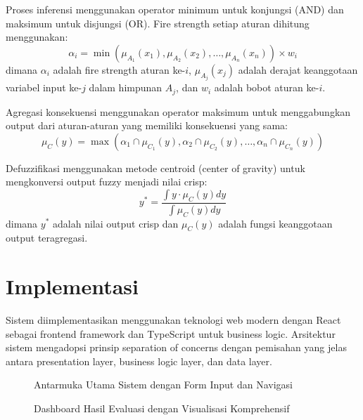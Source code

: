 \documentclass[12pt,a4paper]{article}
\begin{document}
Proses inferensi menggunakan operator minimum untuk konjungsi (AND) dan maksimum untuk disjungsi (OR). Fire strength setiap aturan dihitung menggunakan:
\begin{equation}
\alpha_i = \min(\mu_{A_1}(x_1), \mu_{A_2}(x_2), \dots, \mu_{A_n}(x_n)) \times w_i
\end{equation}
dimana $\alpha_i$ adalah fire strength aturan ke-$i$, $\mu_{A_j}(x_j)$ adalah derajat keanggotaan variabel input ke-$j$ dalam himpunan $A_j$, dan $w_i$ adalah bobot aturan ke-$i$.

Agregasi konsekuensi menggunakan operator maksimum untuk menggabungkan output dari aturan-aturan yang memiliki konsekuensi yang sama:
\begin{equation}
\mu_C(y) = \max(\alpha_1 \cap \mu_{C_1}(y), \alpha_2 \cap \mu_{C_2}(y), \dots, \alpha_n \cap \mu_{C_n}(y))
\end{equation}

Defuzzifikasi menggunakan metode centroid (center of gravity) untuk mengkonversi output fuzzy menjadi nilai crisp:
\begin{equation}
y^* = \frac{\int y \cdot \mu_C(y) dy}{\int \mu_C(y) dy}
\end{equation}
dimana $y^*$ adalah nilai output crisp dan $\mu_C(y)$ adalah fungsi keanggotaan output teragregasi.

\section{Implementasi}

Sistem diimplementasikan menggunakan teknologi web modern dengan React sebagai frontend framework dan TypeScript untuk business logic. Arsitektur sistem mengadopsi prinsip separation of concerns dengan pemisahan yang jelas antara presentation layer, business logic layer, dan data layer.

\begin{figure}[htbp] %
    \centering
    \caption{Antarmuka Utama Sistem dengan Form Input dan Navigasi}
    \label{fig:ui-main}
\end{figure}

\begin{figure}[htbp] %
    \centering
    \caption{Dashboard Hasil Evaluasi dengan Visualisasi Komprehensif}
    \label{fig:ui-results}
\end{figure}
\end{document}
